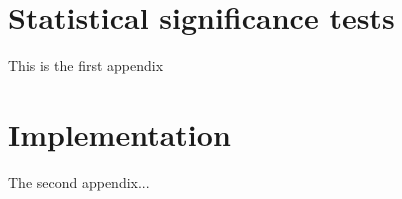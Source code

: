 \begin{appendix}
\chapter{Statistical significance tests}
\label{app1:cha}
This is the first appendix


\chapter{Implementation}
The second appendix...
\end{appendix}
